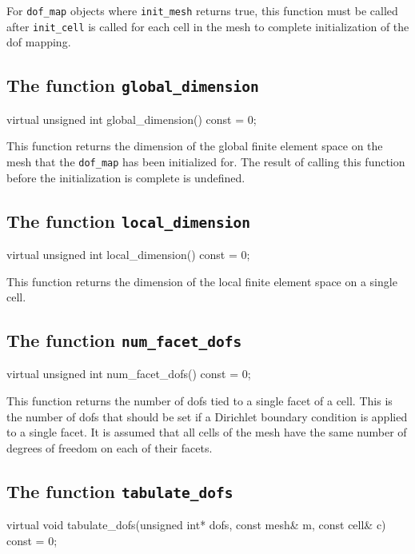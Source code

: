 For \texttt{dof\_map} objects where \texttt{init\_mesh} returns true,
this function must be called after \texttt{init\_cell} is called for
each cell in the mesh to complete initialization of the dof mapping.

\subsection{The function \texttt{global\_dimension}}

\begin{code}
virtual unsigned int global_dimension() const = 0;
\end{code}

This function returns the dimension of the global finite element space
on the mesh that the \texttt{dof\_map} has been initialized for. The
result of calling this function before the initialization is complete
is undefined.

\subsection{The function \texttt{local\_dimension}}

\begin{code}
virtual unsigned int local_dimension() const = 0;
\end{code}

This function returns the dimension of the local finite element space
on a single cell.

\subsection{The function \texttt{num\_facet\_dofs}}

\begin{code}
virtual unsigned int num_facet_dofs() const = 0;
\end{code}

This function returns the number of dofs tied to a single facet of a
cell. This is the number of dofs that should be set if a Dirichlet
boundary condition is applied to a single facet. It is assumed that
all cells of the mesh have the same number of degrees of freedom on
each of their facets.

\subsection{The function \texttt{tabulate\_dofs}}

\begin{code}
virtual void tabulate_dofs(unsigned int* dofs,
                           const mesh& m,
                           const cell& c) const = 0;
\end{code}

